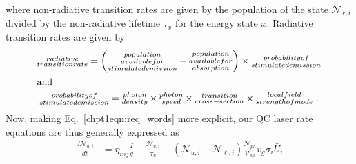 \documentclass[12pt]{report}
\begin{document}
{\begin{subequations}
\begin{align}
\end{align}
\end{subequations}
where non-radiative transition rates are given by the population of the state $\mathcal{N}_{x,i}$ divided by the non-radiative lifetime $\tau_x$ for the energy state $x$.  Radiative transition rates are given by
\begin{gather*}
\begin{subarray}{c}{radiative}\\{transition rate}\end{subarray} =
\left( \begin{subarray}{c}{population}\\{available for}\\{stimulated emission}\end{subarray} - \begin{subarray}{c}{population}\\{available for}\\{absorption}\end{subarray}\right) \times \begin{subarray}{c}{probability of}\\{stimulated emission}\end{subarray}\\
\intertext{and}
\begin{subarray}{c}{probability of}\\{stimulated emission}\end{subarray} = \begin{subarray}{c}{photon}\\{density}\end{subarray} \times \begin{subarray}{c}{photon}\\{speed}\end{subarray} \times \begin{subarray}{c}{transition}\\{cross-section}\end{subarray} \times
\begin{subarray}{c}{local field}\\{strength of mode}\end{subarray} {~.}
\end{gather*}
Now, making Eq.~\eqref{chpt1eqn:req_words} more explicit, our QC laser rate equations are thus generally expressed as
\begin{subequations}
\label{chpt1eqn:req1}
\begin{align}
\frac{d \mathcal{N}_{u,i}}{dt} &= \eta_{inj}\frac{I}{q} - \frac{\mathcal{N}_{u,i}}{\tau_u} - \left( \mathcal{N}_{u,i} - \mathcal{N}_{\ell,i}\right) \frac{\mathcal{N}_{ph}}{\mathcal{V}_{ph}} v_g \sigma_i \bar{U}_i\\

\end{align}
\end{subequations}}
\end{document}
